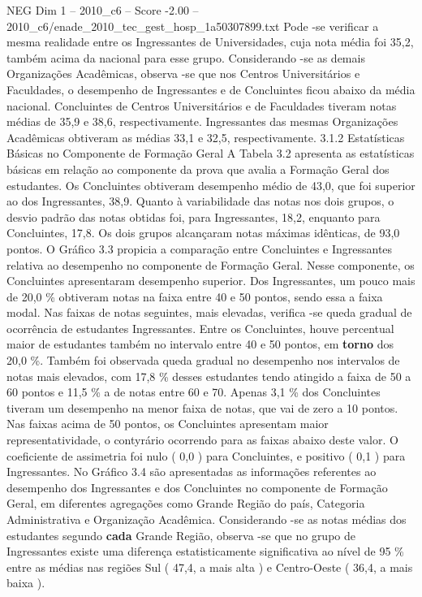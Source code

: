 \begin{textsample}{NEG Dim 1 – 2010\_c6 – Score -2.00 – 2010\_c6/enade\_2010\_tec\_gest\_hosp\_1a50307899.txt}
Pode -se verificar a mesma realidade entre os Ingressantes de Universidades, cuja nota média foi 35,2, também acima da nacional para esse grupo.
Considerando -se as demais Organizações Acadêmicas, observa -se que nos Centros Universitários e Faculdades, o desempenho de Ingressantes e de Concluintes ficou abaixo da média nacional.
Concluintes de Centros Universitários e de Faculdades tiveram notas médias de 35,9 e 38,6, respectivamente.
Ingressantes das mesmas Organizações Acadêmicas obtiveram as médias 33,1 e 32,5, respectivamente. 3.1.2 Estatísticas Básicas no Componente de Formação Geral A Tabela 3.2 apresenta as estatísticas básicas em relação ao componente da prova que avalia a Formação Geral dos estudantes.
Os Concluintes obtiveram desempenho médio de 43,0, que foi superior ao dos Ingressantes, 38,9.
Quanto à variabilidade das notas nos dois grupos, o desvio padrão das notas obtidas foi, para Ingressantes, 18,2, enquanto para Concluintes, 17,8.
Os dois grupos alcançaram notas máximas idênticas, de 93,0 pontos.
O Gráfico 3.3 propicia a comparação entre Concluintes e Ingressantes relativa ao desempenho no componente de Formação Geral.
Nesse componente, os Concluintes apresentaram desempenho superior.
Dos Ingressantes, um pouco mais de 20,0 \% obtiveram notas na faixa entre 40 e 50 pontos, sendo essa a faixa modal.
Nas faixas de notas seguintes, mais elevadas, verifica -se queda gradual de ocorrência de estudantes Ingressantes.
Entre os Concluintes, houve percentual maior de estudantes também no intervalo entre 40 e 50 pontos, em \textbf{torno} dos 20,0 \%.
Também foi observada queda gradual no desempenho nos intervalos de notas mais elevados, com 17,8 \% desses estudantes tendo atingido a faixa de 50 a 60 pontos e 11,5 \% a de notas entre 60 e 70.
Apenas 3,1 \% dos Concluintes tiveram um desempenho na menor faixa de notas, que vai de zero a 10 pontos.
Nas faixas acima de 50 pontos, os Concluintes apresentam maior representatividade, o contyrário ocorrendo para as faixas abaixo deste valor.
O coeficiente de assimetria foi nulo ( 0,0 ) para Concluintes, e positivo ( 0,1 ) para Ingressantes.
No Gráfico 3.4 são apresentadas as informações referentes ao desempenho dos Ingressantes e dos Concluintes no componente de Formação Geral, em diferentes agregações como Grande Região do país, Categoria Administrativa e Organização Acadêmica.
Considerando -se as notas médias dos estudantes segundo \textbf{cada} Grande Região, observa -se que no grupo de Ingressantes existe uma diferença estatisticamente significativa ao nível de 95 \% entre as médias nas regiões Sul ( 47,4, a mais alta ) e Centro-Oeste ( 36,4, a mais baixa ).

\end{textsample}

